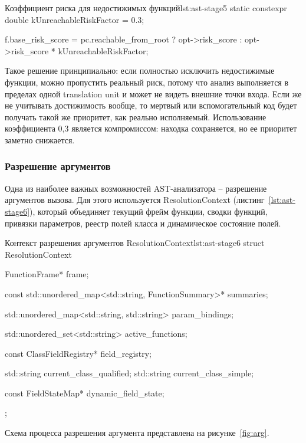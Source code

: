 \documentclass{itmo-vkr}
\begin{document}
\begin{itmolisting}[C++]{Коэффициент риска для недостижимых функций}{lst:ast-stage5}
    static constexpr double kUnreachableRiskFactor = 0.3;

    f.base_risk_score = pc.reachable_from_root
    ? opt->risk_score
    : opt->risk_score * kUnreachableRiskFactor;
\end{itmolisting}

Такое решение принципиально: если полностью исключить недостижимые функции, можно пропустить реальный риск, потому что анализ выполняется в пределах одной translation unit и может не видеть внешние точки входа. Если же не учитывать достижимость вообще, то мертвый или вспомогательный код будет получать такой же приоритет, как реально исполняемый. Использование коэффициента 0,3 является компромиссом: находка сохраняется, но ее приоритет заметно снижается.

\subsubsection{Разрешение аргументов}

Одна из наиболее важных возможностей AST-анализатора -- разрешение аргументов вызова. Для этого используется ResolutionContext (листинг~\ref{lst:ast-stage6}), который объединяет текущий фрейм функции, сводки функций, привязки параметров, реестр полей класса и динамическое состояние полей.

	
\begin{itmolisting}[C++]{Контекст разрешения аргументов ResolutionContext}{lst:ast-stage6}
struct ResolutionContext {
    FunctionFrame* frame;
    
    const std::unordered_map<std::string, FunctionSummary>* summaries;
    
    std::unordered_map<std::string, std::string> param_bindings;
    
    std::unordered_set<std::string> active_functions;
    
    const ClassFieldRegistry* field_registry;
    
    std::string current_class_qualified;
    std::string current_class_simple;
    
    const FieldStateMap* dynamic_field_state;
};
\end{itmolisting}

Схема процесса разрешения аргумента представлена на рисунке~\ref{fig:arg}.
\end{document}
